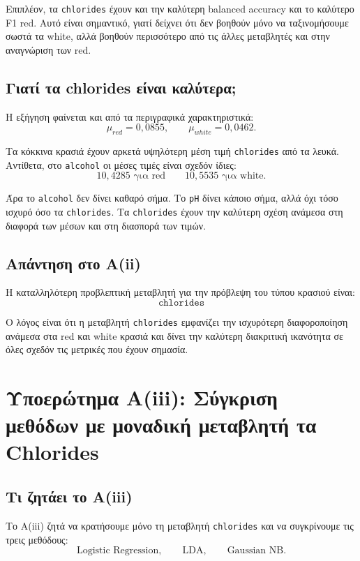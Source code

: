 \documentclass[11pt,a4paper]{article}
\newcommand{\code}[1]{\texttt{#1}}
\begin{document}
Επιπλέον, τα \code{chlorides} έχουν και την καλύτερη balanced accuracy και το
καλύτερο F1 red. Αυτό είναι σημαντικό, γιατί δείχνει ότι δεν βοηθούν μόνο να
ταξινομήσουμε σωστά τα white, αλλά βοηθούν περισσότερο από τις άλλες
μεταβλητές και στην αναγνώριση των red.

\subsection{Γιατί τα chlorides είναι καλύτερα;}

Η εξήγηση φαίνεται και από τα περιγραφικά χαρακτηριστικά:
\[
\mu_{red}=0{,}0855,
\qquad
\mu_{white}=0{,}0462.
\]

Τα κόκκινα κρασιά έχουν αρκετά υψηλότερη μέση τιμή \code{chlorides} από τα
λευκά. Αντίθετα, στο \code{alcohol} οι μέσες τιμές είναι σχεδόν ίδιες:
\[
10{,}4285 \text{ για red}
\qquad
10{,}5535 \text{ για white}.
\]

Άρα το \code{alcohol} δεν δίνει καθαρό σήμα. Το \code{pH} δίνει κάποιο σήμα,
αλλά όχι τόσο ισχυρό όσο τα \code{chlorides}. Τα \code{chlorides} έχουν την
καλύτερη σχέση ανάμεσα στη διαφορά των μέσων και στη διασπορά των τιμών.

\subsection{Απάντηση στο Α(ii)}

Η καταλληλότερη προβλεπτική μεταβλητή για την πρόβλεψη του τύπου κρασιού
είναι:
\[
\boxed{\code{chlorides}}
\]

Ο λόγος είναι ότι η μεταβλητή \code{chlorides} εμφανίζει την ισχυρότερη
διαφοροποίηση ανάμεσα στα red και white κρασιά και δίνει την καλύτερη
διακριτική ικανότητα σε όλες σχεδόν τις μετρικές που έχουν σημασία.

\section[Α(iii): Σύγκριση με Chlorides]{Υποερώτημα Α(iii): Σύγκριση μεθόδων με μοναδική μεταβλητή τα Chlorides}

\subsection{Τι ζητάει το Α(iii)}

Το Α(iii) ζητά να κρατήσουμε μόνο τη μεταβλητή \code{chlorides} και να
συγκρίνουμε τις τρεις μεθόδους:
\[
\text{Logistic Regression}, \qquad
\text{LDA}, \qquad
\text{Gaussian NB}.
\]
\end{document}
